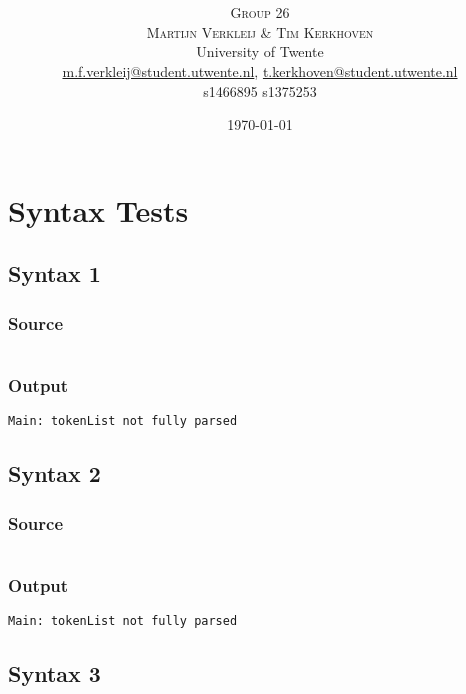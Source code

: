 \documentclass[twoside]{report}
\title{\vspace{-15mm}\fontsize{24pt}{10pt}\selectfont\textbf{\articletitle}} %
\author{
\large
\textsc{Group 26}\\[-0.75mm]
\textsc{Martijn Verkleij \& Tim Kerkhoven}\\[2mm] %
\normalsize University of Twente \\ %
\normalsize \href{mailto:m.f.verkleij@student.utwente.nl}{m.f.verkleij@student.utwente.nl},
\href{mailto:t.kerkhoven@student.utwente.nl}{t.kerkhoven@student.utwente.nl}\\%
\normalsize s1466895 s1375253
}
\date{\today}
\begin{document}
\thispagestyle{empty}
\maketitle %



\tableofcontents


\chapter{Syntax Tests}

\section{Syntax 1}
\subsection{Source}
\inputminted[tabsize=4,linenos,firstnumber=1]{text}{../test/syntax1.shl}
\subsection{Output}
\begin{verbatim}
Main: tokenList not fully parsed
\end{verbatim}

\section{Syntax 2}
\subsection{Source}
\inputminted[tabsize=4,linenos,firstnumber=1]{text}{../test/syntax2.shl}
\subsection{Output}
\begin{verbatim}
Main: tokenList not fully parsed
\end{verbatim}

\section{Syntax 3}
\end{document}
